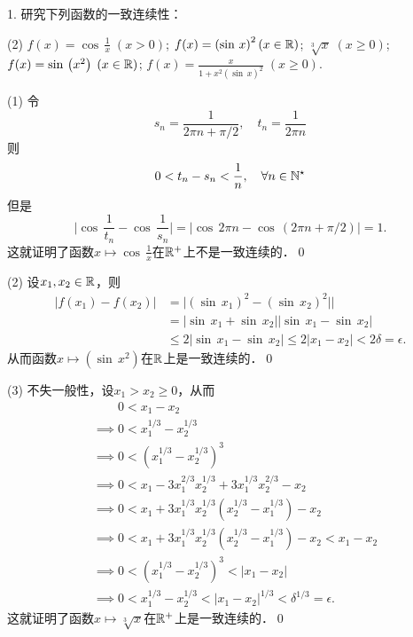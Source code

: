 \exercise

1. 研究下列函数的一致连续性：
\begin{tasks}(2)
    \task $f(x) = \cos \, \displaystyle\frac{1}{x} \; (x > 0)$;
    \task $f(x) = \left(\sin \, x\right)^2 \left(x \in \mathbb{R}\right)$;
    \task $\sqrt[3]{x} \; (x \geq 0)$; 
    \task $f(x) = \sin \, \left(x^2\right) \; (x \in \mathbb{R})$;
    \task $f(x) = \displaystyle\frac{x}{1+x^2 \left(\sin \, x\right)^2} \; (x \geq 0)$.
\end{tasks}

(1) \prove 令
\begin{equation}
    s_n = \frac{1}{2\pi n + \pi /2}, \quad t_n = \frac{1}{2\pi n}
\end{equation}
则
\begin{equation}
    0 < t_n - s_n < \frac{1}{n}, \quad \forall n \in \mathbb{N}^\star
\end{equation}
但是
\begin{equation}
    \bigg\lvert \cos \, \frac{1}{t_n} - \cos \, \frac{1}{s_n} \bigg\rvert = \lvert \cos \, 2 \pi n -  \cos \, \left(2 \pi n + \pi /2\right) \rvert = 1.
\end{equation}
这就证明了函数$x \mapsto \cos \, \displaystyle\frac{1}{x}$在$\mathbb{R}^+$上不是一致连续的．\qed\bigskip

(2) \prove 设$x_1, x_2 \in \mathbb{R}$，则
\begin{align}
    \lvert f(x_1) - f(x_2) \rvert &= \lvert \left(\sin \, x_1\right)^2 - \left(\sin \, x_2\right)^2 \rvert \rvert \\
    &= \lvert \sin \, x_1 + \sin \, x_2 \rvert \lvert \sin \, x_1 - \sin \, x_2 \rvert \\
    &\leq 2\lvert \sin \, x_1 - \sin \, x_2 \rvert \leq 2 \lvert x_1 - x_2 \rvert < 2\delta = \epsilon.
\end{align}
从而函数$x \mapsto \left(\sin \, x^2\right)$在$\mathbb{R}$上是一致连续的．\qed\bigskip

(3) \prove 不失一般性，设$x_1 > x_2 \geq 0$，从而
\begin{align}
    &\mathrel{\phantom{\implies}} 0 < x_1 - x_2 \\
    &\implies 0 < x_1^{1/3} - x_2^{1/3} \\
    &\implies 0 < \left(x_1^{1/3}-x_2^{1/3}\right)^3 \\
    &\implies 0 < x_1 - 3 x_1^{2/3}x_2^{1/3} + 3x_1^{1/3}x_2^{2/3} - x_2 \\
    &\implies 0 < x_1 + 3x_1^{1/3}x_2^{1/3} \left(x_2^{1/3} - x_1^{1/3} \right) - x_2 \\
    &\implies 0 < x_1 + 3x_1^{1/3}x_2^{1/3} \left(x_2^{1/3} - x_1^{1/3} \right) - x_2 < x_1 - x_2 \\
    &\implies 0 < (x_1^{1/3} - x_2^{1/3})^3 < \lvert x_1 - x_2 \rvert \\
    &\implies 0 < x_1^{1/3} - x_2^{1/3} < \lvert x_1 - x_2 \rvert^{1/3} < \delta^{1/3} = \epsilon.
\end{align}
这就证明了函数$x \mapsto \sqrt[3]{x}$在$\mathbb{R}^+$上是一致连续的．\qed\bigskip

